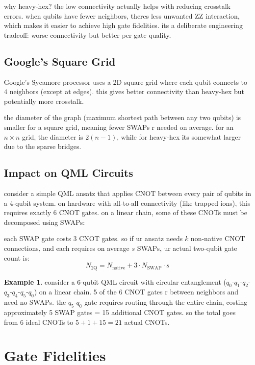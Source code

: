 \documentclass[11pt,a4paper]{article}
\theoremstyle{definition}
\newtheorem{example}{Example}[section]
\theoremstyle{remark}
\begin{document}
why heavy-hex? the low connectivity actually helps with reducing crosstalk errors. when qubits have fewer neighbors, theres less unwanted ZZ interaction, which makes it easier to achieve high gate fidelities. its a deliberate engineering tradeoff: worse connectivity but better per-gate quality.

\subsection{Google's Square Grid}

Google's Sycamore processor uses a 2D square grid where each qubit connects to 4 neighbors (except at edges). this gives better connectivity than heavy-hex but potentially more crosstalk.

the diameter of the graph (maximum shortest path between any two qubits) is smaller for a square grid, meaning fewer SWAPs r needed on average. for an $n \times n$ grid, the diameter is $2(n-1)$, while for heavy-hex its somewhat larger due to the sparse bridges.

\subsection{Impact on QML Circuits}

consider a simple QML ansatz that applies $\text{CNOT}$ between every pair of qubits in a 4-qubit system. on hardware with all-to-all connectivity (like trapped ions), this requires exactly 6 CNOT gates. on a linear chain, some of these CNOTs must be decomposed using SWAPs:

each SWAP gate costs 3 CNOT gates. so if ur ansatz needs $k$ non-native CNOT connections, and each requires on average $s$ SWAPs, ur actual two-qubit gate count is:
\[
N_{\text{2Q}} = N_{\text{native}} + 3 \cdot N_{\text{SWAP}} \cdot s
\]

\begin{example}
consider a 6-qubit QML circuit with circular entanglement ($q_0$-$q_1$-$q_2$-$q_3$-$q_4$-$q_5$-$q_0$) on a linear chain. 5 of the 6 CNOT gates r between neighbors and need no SWAPs. the $q_5$-$q_0$ gate requires routing through the entire chain, costing approximately 5 SWAP gates = 15 additional CNOT gates. so the total goes from 6 ideal CNOTs to $5 + 1 + 15 = 21$ actual CNOTs.
\end{example}

\section{Gate Fidelities}
\end{document}
